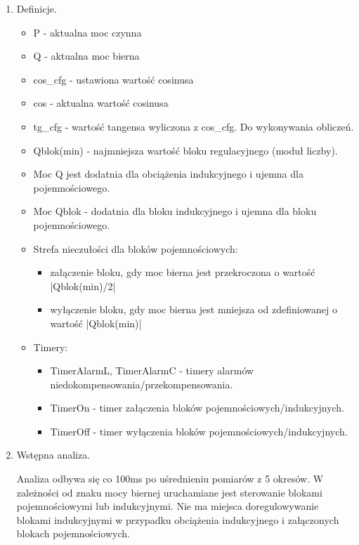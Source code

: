 \documentclass[12pt,a4paper]{article}
\begin{document}
\begin{enumerate}
	\setlength\itemsep{0mm}
	\item Definicje.
	\begin{itemize}
		\vspace{-2mm}
		\setlength\itemsep{0mm}
		\item P - aktualna moc czynna
		\item Q - aktualna moc bierna
		\item cos\_cfg - ustawiona wartość cosinusa
		\item cos - aktualna wartość cosinusa
		\item tg\_cfg - wartość tangensa wyliczona z cos\_cfg. Do wykonywania obliczeń.
		\item Qblok(min) - najmniejsza wartość bloku regulacyjnego (moduł liczby).
		\item Moc Q jest dodatnia dla obciążenia indukcyjnego i ujemna dla pojemnościowego.
		\item Moc Qblok - dodatnia dla bloku indukcyjnego i ujemna dla bloku pojemnościowego.
		\item Strefa nieczułości dla bloków pojemnościowych:
		\begin{itemize}
			\vspace{-2mm}
			\setlength\itemsep{0mm}
			\item załączenie bloku, gdy moc bierna jest przekroczona o wartość |Qblok(min)/2|
			\item wyłączenie bloku, gdy moc bierna jest mniejsza od zdefiniowanej o wartość |Qblok(min)|
		\end{itemize}
		\item Timery:
		\begin{itemize}
			\vspace{-2mm}
			\setlength\itemsep{0mm}
			\item TimerAlarmL, TimerAlarmC - timery alarmów niedokompensowania/przekompensowania.
			\item TimerOn - timer załączenia bloków pojemnościowych/indukcyjnych.
			\item TimerOff - timer wyłączenia bloków pojemnościowych/indukcyjnych.
		\end{itemize}
		\vspace{-2mm}
	\end{itemize}
	\item Wstępna analiza.
	
	Analiza odbywa się co 100ms po uśrednieniu pomiarów z 5 okresów.
	W zależności od znaku mocy biernej uruchamiane jest sterowanie blokami pojemnościowymi
	lub indukcyjnymi. Nie ma miejsca doregulowywanie blokami indukcyjnymi w przypadku obciążenia
	indukcyjnego i załączonych blokach pojemnościowych.
	

\end{enumerate}
\end{document}

